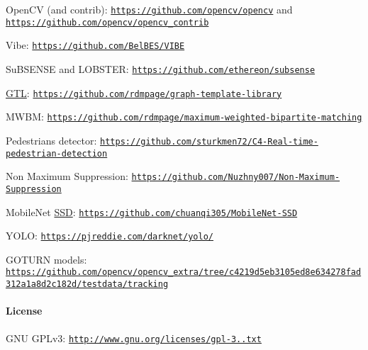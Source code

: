 \begin{DoxyItemize}
\item Open\+CV (and contrib)\+: \href{https://github.com/opencv/opencv}{\tt https\+://github.\+com/opencv/opencv} and \href{https://github.com/opencv/opencv_contrib}{\tt https\+://github.\+com/opencv/opencv\+\_\+contrib}
\item Vibe\+: \href{https://github.com/BelBES/VIBE}{\tt https\+://github.\+com/\+Bel\+B\+E\+S/\+V\+I\+BE}
\item Su\+B\+S\+E\+N\+SE and L\+O\+B\+S\+T\+ER\+: \href{https://github.com/ethereon/subsense}{\tt https\+://github.\+com/ethereon/subsense}
\item \mbox{\hyperlink{namespace_g_t_l}{G\+TL}}\+: \href{https://github.com/rdmpage/graph-template-library}{\tt https\+://github.\+com/rdmpage/graph-\/template-\/library}
\item M\+W\+BM\+: \href{https://github.com/rdmpage/maximum-weighted-bipartite-matching}{\tt https\+://github.\+com/rdmpage/maximum-\/weighted-\/bipartite-\/matching}
\item Pedestrians detector\+: \href{https://github.com/sturkmen72/C4-Real-time-pedestrian-detection}{\tt https\+://github.\+com/sturkmen72/\+C4-\/\+Real-\/time-\/pedestrian-\/detection}
\item Non Maximum Suppression\+: \href{https://github.com/Nuzhny007/Non-Maximum-Suppression}{\tt https\+://github.\+com/\+Nuzhny007/\+Non-\/\+Maximum-\/\+Suppression}
\item Mobile\+Net \mbox{\hyperlink{class_s_s_d}{S\+SD}}\+: \href{https://github.com/chuanqi305/MobileNet-SSD}{\tt https\+://github.\+com/chuanqi305/\+Mobile\+Net-\/\+S\+SD}
\item Y\+O\+LO\+: \href{https://pjreddie.com/darknet/yolo/}{\tt https\+://pjreddie.\+com/darknet/yolo/}
\item G\+O\+T\+U\+RN models\+: \href{https://github.com/opencv/opencv_extra/tree/c4219d5eb3105ed8e634278fad312a1a8d2c182d/testdata/tracking}{\tt https\+://github.\+com/opencv/opencv\+\_\+extra/tree/c4219d5eb3105ed8e634278fad312a1a8d2c182d/testdata/tracking}
\end{DoxyItemize}

\paragraph*{License}

G\+NU G\+P\+Lv3\+: \href{http://www.gnu.org/licenses/gpl-3.0.txt}{\tt http\+://www.\+gnu.\+org/licenses/gpl-\/3..\+txt} 